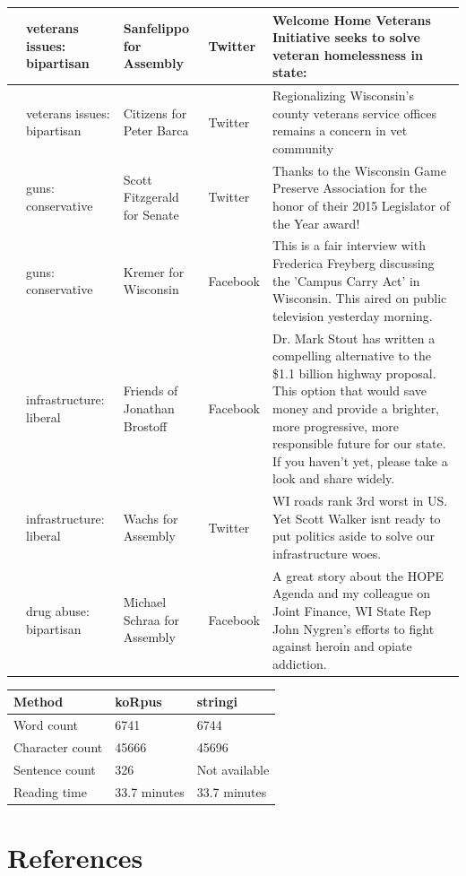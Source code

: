\documentclass[12pt,]{article}
\begin{document}
\begin{longtable}[t]{>{\raggedright\arraybackslash}p{.65in}|>{\raggedright\arraybackslash}p{.6in}|>{\raggedright\arraybackslash}p{.7in}|>{\raggedright\arraybackslash}p{.6in}|>{\raggedright\arraybackslash}p{3in}}
\hline
6 & veterans issues: bipartisan & Sanfelippo for Assembly & Twitter & Welcome Home Veterans Initiative seeks to solve veteran homelessness in state:\\
\hline
7 & veterans issues: bipartisan & Citizens for Peter Barca & Twitter & Regionalizing Wisconsin's county veterans service offices remains a concern in vet community\\
\hline
8 & guns: conservative & Scott Fitzgerald for Senate & Twitter & Thanks to the Wisconsin Game Preserve Association for the honor of their 2015 Legislator of the Year award!\\
\hline
9 & guns: conservative & Kremer for Wisconsin & Facebook & This is a fair interview with Frederica Freyberg discussing the 'Campus Carry Act' in Wisconsin.  This aired on public television yesterday morning.\\
\hline
10 & infrastructure: liberal & Friends of Jonathan Brostoff & Facebook & Dr. Mark Stout has written a compelling alternative to the \$1.1 billion highway proposal. This option that would save money and provide a brighter, more progressive, more responsible future for our state. If you haven't yet, please take a look and share widely.\\
\hline
11 & infrastructure: liberal & Wachs for Assembly & Twitter & WI roads rank 3rd worst in US. Yet Scott Walker isnt ready to put politics aside to solve our infrastructure woes.\\
\hline
12 & drug abuse: bipartisan & Michael Schraa for Assembly & Facebook & A great story about the HOPE Agenda and my colleague on Joint Finance, WI State Rep John Nygren's efforts to fight against heroin and opiate addiction.\\
\hline
\end{longtable}

\begin{tabular}{l|l|l}
\hline
Method & koRpus & stringi\\
\hline
Word count & 6741 & 6744\\
\hline
Character count & 45666 & 45696\\
\hline
Sentence count & 326 & Not available\\
\hline
Reading time & 33.7 minutes & 33.7 minutes\\
\hline
\end{tabular}

\hypertarget{references}{%
\section*{References}\label{references}}
\end{document}
